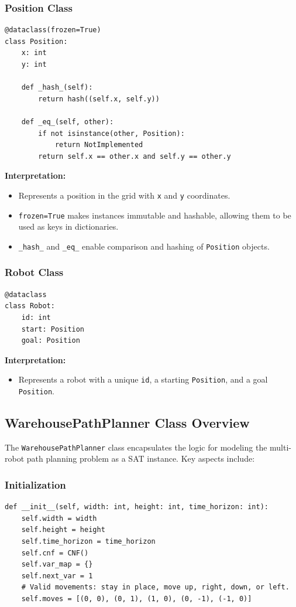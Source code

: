 \documentclass[8pt]{article}
\begin{document}
\subsubsection*{Position Class}

\begin{lstlisting}
@dataclass(frozen=True)
class Position:
    x: int
    y: int

    def _hash_(self):
        return hash((self.x, self.y))

    def _eq_(self, other):
        if not isinstance(other, Position):
            return NotImplemented
        return self.x == other.x and self.y == other.y
\end{lstlisting}

\textbf{Interpretation:}
\begin{itemize}
    \item Represents a position in the grid with \texttt{x} and \texttt{y} coordinates.
    \item \texttt{frozen=True} makes instances immutable and hashable, allowing them to be used as keys in dictionaries.
    \item \texttt{\_hash\_} and \texttt{\_eq\_} enable comparison and hashing of \texttt{Position} objects.
\end{itemize}

\subsubsection*{Robot Class}

\begin{lstlisting}
@dataclass
class Robot:
    id: int
    start: Position
    goal: Position
\end{lstlisting}

\textbf{Interpretation:}
\begin{itemize}
    \item Represents a robot with a unique \texttt{id}, a starting \texttt{Position}, and a goal \texttt{Position}.
\end{itemize}

\subsection{WarehousePathPlanner Class Overview}
The \texttt{WarehousePathPlanner} class encapsulates the logic for modeling the multi-robot path planning problem as a SAT instance. Key aspects include:

\subsubsection*{Initialization}
\begin{lstlisting}
def __init__(self, width: int, height: int, time_horizon: int):
    self.width = width
    self.height = height
    self.time_horizon = time_horizon
    self.cnf = CNF()
    self.var_map = {}
    self.next_var = 1
    # Valid movements: stay in place, move up, right, down, or left.
    self.moves = [(0, 0), (0, 1), (1, 0), (0, -1), (-1, 0)]
\end{lstlisting}
\end{document}
